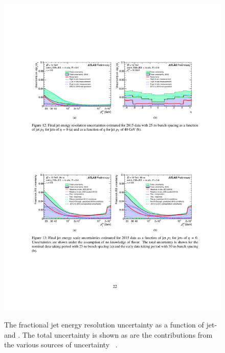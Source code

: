 \begin{figure}[!ht]
  \begin{center}
    \captionsetup[subfigure]{aboveskip=0pt,justification=centering}
     {\includegraphics[width=0.48\linewidth, angle=0]{figs/Objects/jets_uncert_JER_pt.pdf} }
  \end{center}
  \caption[The fractional jet energy resolution uncertainty as a function of jet-\pT and \eta.
    The total uncertainty is shown as are the contributions from the various sources of uncertainty.]
          {The fractional jet energy resolution uncertainty as a function of jet-\pT and \eta.
            The total uncertainty is shown as are the contributions from the various sources of uncertainty ~\cite{obj-jets_calib_2015}.}
  \label{fig:obj-jets_calib_JER}
\end{figure}

